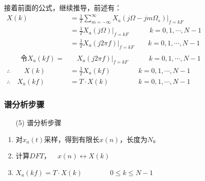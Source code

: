 \documentclass[notheorems,compress,mathserif,table]{beamer}
\begin{document}
\begin{frame}[shrink]\frametitle{}%
接着前面的公式，继续推导，前述有：
\begin{equation*}
\begin{split}
X(k) \quad  &=  \frac{1}{T}\sum_{m=-\infty}^{\infty}X_a\left(j\Omega-j m\Omega_s\right)\Big|_{ f  = k F  }  \qquad\qquad\qquad\qquad\qquad\qquad\qquad\qquad \\
			&=  \frac{1}{T} X_a\left(j\Omega\right)\Big|_{ f  = k F  }     \qquad\quad  k = 0,1,\cdots ,N-1  \\
			&=  \frac{1}{T} X_a\left(j 2\pi f\right)\Big|_{ f  = k F  }     \qquad  k = 0,1,\cdots ,N-1\\
	\quad   &\quad   \quad  \\
\qquad\mbox{令}X_a(kf) =
			&\quad   X_a\left(j 2\pi f\right)\big|_{ f  = k F  }  \qquad\quad k = 0,1,\cdots ,N-1 \\
\therefore\qquad X(k)     
			&=  \frac{1}{T} X_a(kf)    \qquad\qquad k = 0,1,\cdots ,N-1\\
\therefore\quad X_a(kf)   
			&= T\cdot X(k)             \;\qquad\qquad k = 0,1,\cdots ,N-1
\end{split}
\end{equation*}
\end{frame}



\begin{frame}[shrink]\frametitle{谱分析步骤}%

\begin{enumerate}
	\item [(5)] 谱分析步骤
\end{enumerate}  
  
        \begin{enumerate}
          \item 对$x_a(t)$采样，得到有限长$x(n)$，长度为$N$。
          \item 计算$DFT$，$\quad x(n)\longleftrightarrow X(k)$
          \item $X_a(kf)   = T\cdot X(k)   \qquad\qquad 0\leq k \leq N-1$
        \end{enumerate}

\end{frame}
\end{document}
